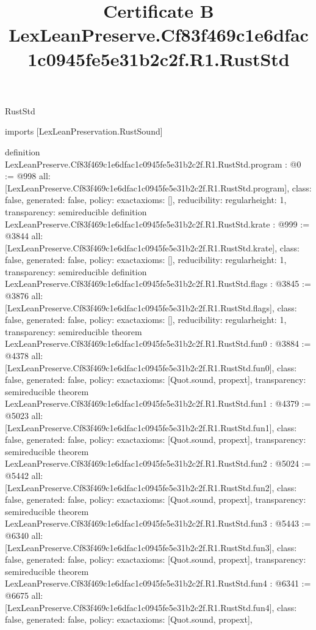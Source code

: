 \begin{lexlean}{RustStd}
\title{Certificate B LexLeanPreserve.Cf83f469c1e6dfac1c0945fe5e31b2c2f.R1.RustStd}
\begin{coremodule}
imports [LexLeanPreservation.RustSound]

definition LexLeanPreserve.Cf83f469c1e6dfac1c0945fe5e31b2c2f.R1.RustStd.program : @0 := @998 {
  all: [LexLeanPreserve.Cf83f469c1e6dfac1c0945fe5e31b2c2f.R1.RustStd.program],
  class: false,
  generated: false,
  policy: exact{axioms: []},
  reducibility: regular{height: 1},
  transparency: semireducible
}
definition LexLeanPreserve.Cf83f469c1e6dfac1c0945fe5e31b2c2f.R1.RustStd.krate : @999 := @3844 {
  all: [LexLeanPreserve.Cf83f469c1e6dfac1c0945fe5e31b2c2f.R1.RustStd.krate],
  class: false,
  generated: false,
  policy: exact{axioms: []},
  reducibility: regular{height: 1},
  transparency: semireducible
}
definition LexLeanPreserve.Cf83f469c1e6dfac1c0945fe5e31b2c2f.R1.RustStd.flags : @3845 := @3876 {
  all: [LexLeanPreserve.Cf83f469c1e6dfac1c0945fe5e31b2c2f.R1.RustStd.flags],
  class: false,
  generated: false,
  policy: exact{axioms: []},
  reducibility: regular{height: 1},
  transparency: semireducible
}
theorem LexLeanPreserve.Cf83f469c1e6dfac1c0945fe5e31b2c2f.R1.RustStd.fun0 : @3884 := @4378 {
  all: [LexLeanPreserve.Cf83f469c1e6dfac1c0945fe5e31b2c2f.R1.RustStd.fun0],
  class: false,
  generated: false,
  policy: exact{axioms: [Quot.sound, propext]},
  transparency: semireducible
}
theorem LexLeanPreserve.Cf83f469c1e6dfac1c0945fe5e31b2c2f.R1.RustStd.fun1 : @4379 := @5023 {
  all: [LexLeanPreserve.Cf83f469c1e6dfac1c0945fe5e31b2c2f.R1.RustStd.fun1],
  class: false,
  generated: false,
  policy: exact{axioms: [Quot.sound, propext]},
  transparency: semireducible
}
theorem LexLeanPreserve.Cf83f469c1e6dfac1c0945fe5e31b2c2f.R1.RustStd.fun2 : @5024 := @5442 {
  all: [LexLeanPreserve.Cf83f469c1e6dfac1c0945fe5e31b2c2f.R1.RustStd.fun2],
  class: false,
  generated: false,
  policy: exact{axioms: [Quot.sound, propext]},
  transparency: semireducible
}
theorem LexLeanPreserve.Cf83f469c1e6dfac1c0945fe5e31b2c2f.R1.RustStd.fun3 : @5443 := @6340 {
  all: [LexLeanPreserve.Cf83f469c1e6dfac1c0945fe5e31b2c2f.R1.RustStd.fun3],
  class: false,
  generated: false,
  policy: exact{axioms: [Quot.sound, propext]},
  transparency: semireducible
}
theorem LexLeanPreserve.Cf83f469c1e6dfac1c0945fe5e31b2c2f.R1.RustStd.fun4 : @6341 := @6675 {
  all: [LexLeanPreserve.Cf83f469c1e6dfac1c0945fe5e31b2c2f.R1.RustStd.fun4],
  class: false,
  generated: false,
  policy: exact{axioms: [Quot.sound, propext]},
}
\end{coremodule}
\end{lexlean}
